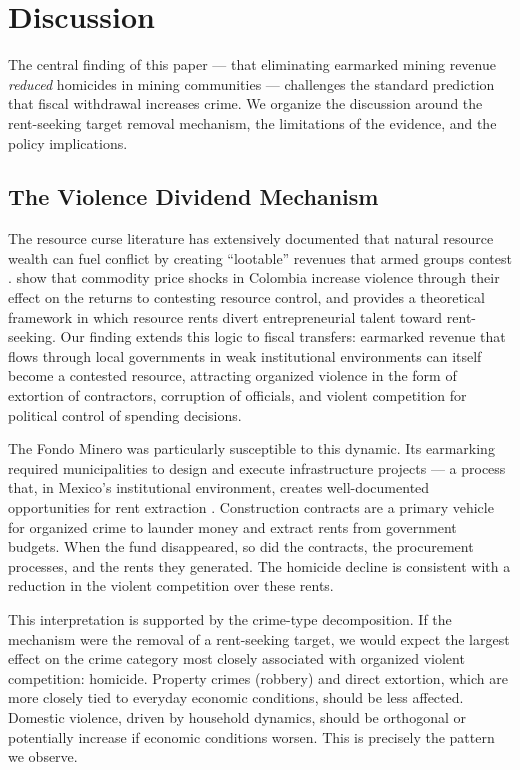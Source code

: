 \documentclass[12pt]{article}
\begin{document}



\section{Discussion}

The central finding of this paper --- that eliminating earmarked mining revenue \textit{reduced} homicides in mining communities --- challenges the standard prediction that fiscal withdrawal increases crime. We organize the discussion around the rent-seeking target removal mechanism, the limitations of the evidence, and the policy implications.

\subsection{The Violence Dividend Mechanism}

The resource curse literature has extensively documented that natural resource wealth can fuel conflict by creating ``lootable'' revenues that armed groups contest \citep{berman2017mine, ross2015oil, collier2008bottom}. \citet{dube2013commodity} show that commodity price shocks in Colombia increase violence through their effect on the returns to contesting resource control, and \citet{torvik2002natural} provides a theoretical framework in which resource rents divert entrepreneurial talent toward rent-seeking. Our finding extends this logic to fiscal transfers: earmarked revenue that flows through local governments in weak institutional environments can itself become a contested resource, attracting organized violence in the form of extortion of contractors, corruption of officials, and violent competition for political control of spending decisions.

The Fondo Minero was particularly susceptible to this dynamic. Its earmarking required municipalities to design and execute infrastructure projects --- a process that, in Mexico's institutional environment, creates well-documented opportunities for rent extraction \citep{brollo2011corruption, delvalle2023fiscal}. Construction contracts are a primary vehicle for organized crime to launder money and extract rents from government budgets. When the fund disappeared, so did the contracts, the procurement processes, and the rents they generated. The homicide decline is consistent with a reduction in the violent competition over these rents.

This interpretation is supported by the crime-type decomposition. If the mechanism were the removal of a rent-seeking target, we would expect the largest effect on the crime category most closely associated with organized violent competition: homicide. Property crimes (robbery) and direct extortion, which are more closely tied to everyday economic conditions, should be less affected. Domestic violence, driven by household dynamics, should be orthogonal or potentially increase if economic conditions worsen. This is precisely the pattern we observe.
\end{document}
